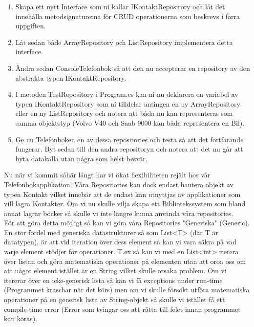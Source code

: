 \documentclass{article}
\begin{document}
    \begin{enumerate}
                 \item Skapa ett nytt Interface som ni kallar IKontaktRepository och låt det innehålla metodsignaturerna för CRUD operationerna som beskrevs i förra uppgiften.
                 \item Låt sedan både ArrayRepository och ListRepository implementera detta interface.
                 \item Ändra sedan ConsoleTelefonbok så att den nu accepterar en repository av den abstrakta typen IKontaktRepository.
                 \item I metoden TestRepository i Program.cs kan ni nu deklarera en variabel av typen IKontaktRepository som ni tilldelar antingen en ny ArrayRepository eller en ny ListRepository och notera att båda nu kan representeras som samma objektstyp (Volvo V40 och Saab 9000 kan båda representera en Bil).
                 \item Ge nu Telefonboken en av dessa repositories och testa så att det fortfarande fungerar. Byt sedan till den andra repositoryn och notera att det nu går att byta datakälla utan några som helst besvär.
    	              
     \end{enumerate}
     
Nu när vi kommit såhär långt har vi ökat flexibiliteten rejält hos vår Telefonbokapplikation! Våra Repositories kan dock endast hantera objekt av typen Kontakt vilket innebär att de endast kan utnyttjas av applikationer som vill lagra Kontakter. Om vi nu skulle vilja skapa ett Bibliotekssystem som bland annat lagrar böcker så skulle vi inte längre kunna använda våra repositories.\\

För att göra detta möjligt så kan vi göra våra Repositories "Generiska" (Generic).\\

En stor fördel med generiska datastrukturer så som List<T> (där T är datatypen), är att vid iteration över dess element så kan vi vara säkra på vad varje element stödjer för operationer. T.ex så kan vi med en List<int> iterera över listan och göra matematiska operationer på elementen utan att oroa oss om att något element istället är en String vilket skulle orsaka problem. Om vi itererar över en icke-generisk lista så kan vi få exceptions under run-time (Programmet kraschar när det körs) men om vi skulle försökt utföra matematiska operationer på en generisk lista av String-objekt så skulle vi istället få ett compile-time error (Error som tvingar oss att rätta till felet innan programmet kan köras).
\end{document}
